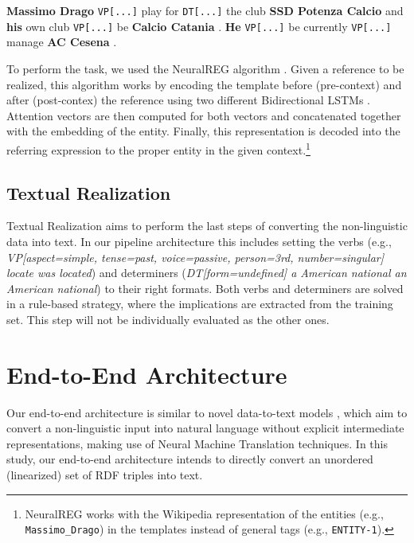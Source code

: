 \documentclass[11pt,a4paper]{article}
\begin{document}
\vspace{0.3cm}
\begin{displayquote}
    \footnotesize
    \vspace{0.1cm}
    \noindent \textbf{Massimo Drago} \texttt{VP[...]} play for \texttt{DT[...]} the club \textbf{SSD Potenza Calcio} and \textbf{his} own club \texttt{VP[...]} be \textbf{Calcio Catania} . \textbf{He} \texttt{VP[...]} be currently \texttt{VP[...]} manage \textbf{AC Cesena} .
    \vspace{0.1cm}
\end{displayquote}
\vspace{0.1cm}

To perform the task, we used the NeuralREG algorithm \cite{ferreira2018}. Given a reference to be realized, this algorithm works by encoding the template before (pre-context) and after (post-contex) the reference using two different Bidirectional LSTMs \cite{hochreiter1997}. Attention vectors are then computed for both vectors and concatenated together with the embedding of the entity. Finally, this representation is decoded into the referring expression to the proper entity in the given context.\footnote{NeuralREG works with the Wikipedia representation of the entities (e.g., \texttt{Massimo\_Drago}) in the templates instead of general tags (e.g., \texttt{ENTITY-1}).}


\subsection{Textual Realization}

Textual Realization aims to perform the last steps of converting the non-linguistic data into text. In our pipeline architecture this includes setting the verbs (e.g., \textit{VP[aspect=simple, tense=past, voice=passive, person=3rd, number=singular] locate  was located}) and determiners (\textit{DT[form=undefined] a American national  an American national}) to their right formats. Both verbs and determiners are solved in a rule-based strategy, where the implications are extracted from the training set. This step will not be individually evaluated as the other ones.

\section{End-to-End Architecture}

Our end-to-end architecture is similar to novel data-to-text models \cite{wen2015,dusek2016,mei2016,lebret2016,gehrmann2018}, which aim to convert a non-linguistic input into natural language without explicit intermediate representations, making use of Neural Machine Translation techniques. In this study, our end-to-end architecture intends to directly convert an unordered (linearized) set of RDF triples into text.
\end{document}

